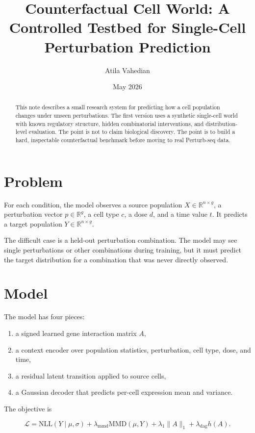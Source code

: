 \documentclass[11pt]{article}
\title{Counterfactual Cell World: A Controlled Testbed for Single-Cell Perturbation Prediction}
\author{Atila Vahedian}
\date{May 2026}
\begin{document}
\maketitle

\begin{abstract}
This note describes a small research system for predicting how a cell population changes under unseen perturbations. The first version uses a synthetic single-cell world with known regulatory structure, hidden combinatorial interventions, and distribution-level evaluation. The point is not to claim biological discovery. The point is to build a hard, inspectable counterfactual benchmark before moving to real Perturb-seq data.
\end{abstract}

\section{Problem}

For each condition, the model observes a source population $X \in \mathbb{R}^{n \times g}$, a perturbation vector $p \in \mathbb{R}^{g}$, a cell type $c$, a dose $d$, and a time value $t$. It predicts a target population $Y \in \mathbb{R}^{n \times g}$.

The difficult case is a held-out perturbation combination. The model may see single perturbations or other combinations during training, but it must predict the target distribution for a combination that was never directly observed.

\section{Model}

The model has four pieces:

\begin{enumerate}
  \item a signed learned gene interaction matrix $A$,
  \item a context encoder over population statistics, perturbation, cell type, dose, and time,
  \item a residual latent transition applied to source cells,
  \item a Gaussian decoder that predicts per-cell expression mean and variance.
\end{enumerate}

The objective is

\[
\mathcal{L}
= \mathrm{NLL}(Y \mid \mu, \sigma)
+ \lambda_{\mathrm{mmd}}\mathrm{MMD}(\mu, Y)
+ \lambda_{1}\lVert A \rVert_{1}
+ \lambda_{\mathrm{dag}} h(A).
\]
\end{document}
